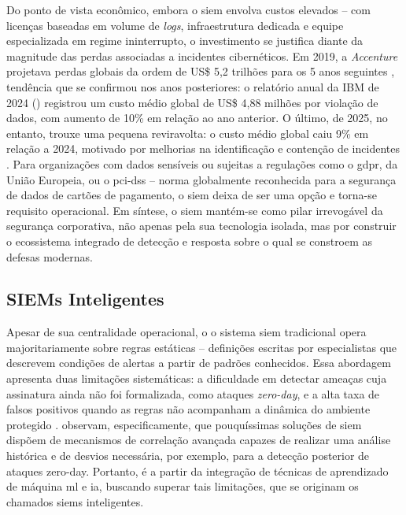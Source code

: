 Do ponto de vista econômico, embora o \gls{siem} envolva custos elevados -- com licenças baseadas em volume de \textit{logs}, infraestrutura dedicada e equipe especializada em regime ininterrupto, o investimento se justifica diante da magnitude das perdas associadas a incidentes cibernéticos. 
Em 2019, a \textit{Accenture} projetava perdas globais da ordem de US\$ 5,2 trilhões para os 5 anos seguintes , tendência que se confirmou nos anos posteriores: 
o relatório anual da IBM de 2024 (\cite{ibm2024costbreach}) registrou um custo médio global de US\$ 4,88 milhões por violação de dados, com aumento de 10\% em relação ao ano anterior. 
O último, de 2025, no entanto, trouxe uma pequena reviravolta: o custo médio global caiu 9\% em relação a 2024, motivado por melhorias na identificação e contenção de incidentes \cite{ibm2025costbreach}.
Para organizações com dados sensíveis ou sujeitas a regulações como o \gls{gdpr}, da União Europeia, ou o \acrshort{pci-dss} -- norma globalmente reconhecida para a segurança de dados de cartões de pagamento, o \gls{siem} deixa de ser uma opção e torna-se requisito operacional. 
Em síntese, o \gls{siem} mantém-se como pilar irrevogável da segurança corporativa, não apenas pela sua tecnologia isolada, mas por construir o ecossistema integrado de detecção e resposta sobre o qual se constroem as defesas modernas.

\subsection{SIEMs Inteligentes}

Apesar de sua centralidade operacional, o o sistema \gls{siem} tradicional opera majoritariamente sobre regras estáticas -- definições escritas por especialistas que descrevem condições de alertas a partir de padrões conhecidos. 
Essa abordagem apresenta duas limitações sistemáticas: a dificuldade em detectar ameaças cuja assinatura ainda não foi formalizada, como ataques \textit{\gls{zero-day}}, e a alta taxa de falsos positivos quando as regras não acompanham a dinâmica do ambiente protegido \cite{gonzalez2021siem, Nurusheva2024}.
 observam, especificamente, que pouquíssimas soluções de \gls{siem} dispõem de mecanismos de correlação avançada capazes de realizar uma análise histórica e de desvios necessária, por exemplo, para a detecção posterior de ataques \gls{zero-day}. 
Portanto, é a partir da integração de técnicas de aprendizado de máquina \gls{ml} e \gls{ia}, buscando superar tais limitações, que se originam os chamados \gls{siem}s inteligentes.


